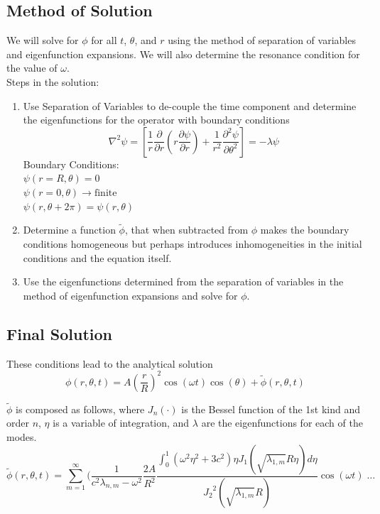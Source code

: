 \documentclass{homework}
\begin{document}
\subsection{Method of Solution}
We will solve for $\phi$ for all $t$, $\theta$, and $r$ using the method of separation of variables and eigenfunction expansions. We will also determine the resonance condition for the value of $\omega$. 
\\[8pt]
\noindent Steps in the solution:
\begin{enumerate}
    \item Use Separation of Variables to de-couple the time component and determine the eigenfunctions for the operator with boundary conditions
    \[ \nabla^2 \psi = \left[ \frac{1}{r} \frac{\partial}{\partial r} \left(r \frac{\partial \psi}{\partial r}\right) + \frac{1}{r^2} \frac{\partial^2 \psi}{\partial \theta^2} \right] = - \lambda \psi \]
    \noindent Boundary Conditions: \\
    $ \psi(r=R, \theta) = 0 $ \\
    $ \psi(r=0, \theta) \rightarrow \textrm{finite} $ \\
    $ \psi(r, \theta + 2\pi) = \psi(r, \theta) $ \\
    \item Determine a function $\tilde{\phi}$, that when subtracted from $\phi$ makes the boundary conditions homogeneous but perhaps introduces inhomogeneities in the initial conditions and the equation itself.
    \item Use the eigenfunctions determined from the separation of variables in the method of eigenfunction expansions and solve for $\phi$.
\end{enumerate} 
\newpage
\subsection{Final Solution}
\noindent These conditions lead to the analytical solution 
$$ \phi(r, \theta, t) = A \left(\frac{r}{R} \right)^2 \cos(\omega t) \cos(\theta) + \tilde{\phi} (r, \theta, t)$$ 

\noindent $\tilde{\phi}$ is composed as follows, where $J_n (\cdot)$ is the Bessel function of the 1st kind and order $n$, $\eta$ is a variable of integration, and $\lambda$ are the eigenfunctions for each of the modes.
$$ \tilde{\phi} (r, \theta, t) = \sum_{m=1}^\infty \Biggl( \frac{1}{c^2 \lambda_{n,m} - \omega^2} \frac{2A}{R^2} \frac{\int_0^1 \left( \omega^2 \eta^2 + 3c^2 \right) \eta J_1\left( \sqrt{\lambda_{1,m}} R \eta \right) d\eta }{{J_2}^2 \left( \sqrt{\lambda_{1,m}} R \right)} \cos(\omega t) \; \dots $$
\end{document}
